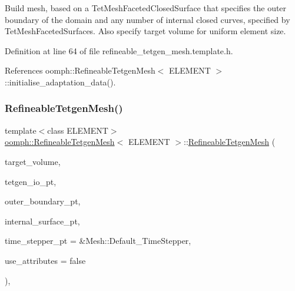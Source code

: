 Build mesh, based on a Tet\+Mesh\+Faceted\+Closed\+Surface that specifies the outer boundary of the domain and any number of internal closed curves, specified by Tet\+Mesh\+Faceted\+Surfaces. Also specify target volume for uniform element size. 



Definition at line 64 of file refineable\+\_\+tetgen\+\_\+mesh.\+template.\+h.



References oomph\+::\+Refineable\+Tetgen\+Mesh$<$ E\+L\+E\+M\+E\+N\+T $>$\+::initialise\+\_\+adaptation\+\_\+data().

\mbox{\label{classoomph_1_1RefineableTetgenMesh_ab1c379c483f5f2a025a68683fbada666}} 
\subsubsection{\texorpdfstring{Refineable\+Tetgen\+Mesh()}{RefineableTetgenMesh()}\hspace{0.1cm}{\footnotesize\ttfamily [2/2]}}
{\footnotesize\ttfamily template$<$class E\+L\+E\+M\+E\+NT$>$ \\
\hyperlink{classoomph_1_1RefineableTetgenMesh}{oomph\+::\+Refineable\+Tetgen\+Mesh}$<$ E\+L\+E\+M\+E\+NT $>$\+::\hyperlink{classoomph_1_1RefineableTetgenMesh}{Refineable\+Tetgen\+Mesh} (\begin{DoxyParamCaption}\item[{const Vector$<$ double $>$ \&}]{target\+\_\+volume,  }\item[{tetgenio $\ast$const \&}]{tetgen\+\_\+io\+\_\+pt,  }\item[{Tet\+Mesh\+Faceted\+Closed\+Surface $\ast$const \&}]{outer\+\_\+boundary\+\_\+pt,  }\item[{Vector$<$ Tet\+Mesh\+Faceted\+Surface $\ast$$>$ \&}]{internal\+\_\+surface\+\_\+pt,  }\item[{Time\+Stepper $\ast$}]{time\+\_\+stepper\+\_\+pt = {\ttfamily \&Mesh\+:\+:Default\+\_\+TimeStepper},  }\item[{const bool \&}]{use\+\_\+attributes = {\ttfamily false} }\end{DoxyParamCaption})\hspace{0.3cm}{\ttfamily [inline]}, {\ttfamily [private]}}



